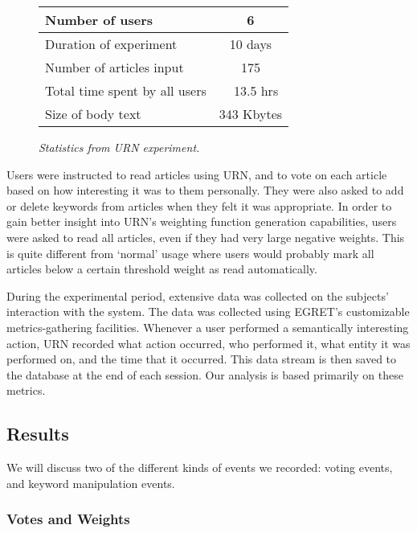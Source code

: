 \begin{figure}[htb]
  \begin{center}
  \small
  \begin{tabular} {|l|c|} \hline
    Number of users & 6 \\ \hline
    Duration of experiment & 10 days \\ \hline
    Number of articles input & 175 \\ \hline
    Total time spent by all users & ~ 13.5 hrs \\ \hline
    Size of body text & 343 Kbytes \\ \hline
  \end{tabular}
  \caption{
  {\em Statistics from URN experiment.}}
  \label{tab:general-stat}
  \normalsize
  \end{center}
\end{figure}

Users were instructed to read articles using URN, and to vote on each article
based on how interesting it was to them personally. They were also asked to add
or delete keywords from articles when they felt it was appropriate. In order to
gain better insight into URN's weighting function generation capabilities,
users were asked to read all articles, even if they had very large negative
weights. This is quite different from `normal' usage where users
would probably mark all articles below a certain threshold weight as read
automatically.

During the experimental period, extensive data was collected on the
subjects' interaction with the system. The data was collected using EGRET's
customizable metrics-gathering facilities. Whenever a user performed a
semantically interesting action, URN recorded what action occurred, who
performed it, what entity it was performed on, and the time that it
occurred. This data stream is then saved to the database at the end of each
session. Our analysis is based primarily on these metrics.

\subsection{Results}

We will discuss two of the different kinds of events we recorded: voting
events, and keyword manipulation events.

\subsubsection{Votes and Weights}

